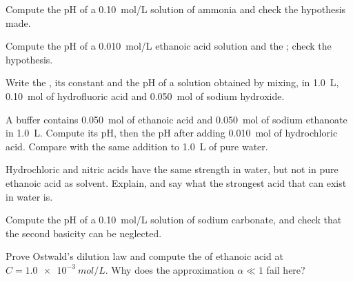 \begin{exercise}[$\star\star$]\label{exo:b1:predominant-reaction:5}
Compute the pH of a \qty{0.10}{mol/L} solution of ammonia and check the
hypothesis made.
\end{exercise}

\begin{exercise}[$\star\star$]\label{exo:b1:predominant-reaction:6}
Compute the pH of a \qty{0.010}{mol/L} ethanoic acid solution and the
; check the hypothesis.
\end{exercise}

\begin{exercise}[$\star\star$]\label{exo:b1:predominant-reaction:7}
Write the , its constant and the pH of a solution
obtained by mixing, in \qty{1.0}{L}, \qty{0.10}{mol} of hydrofluoric acid
and \qty{0.050}{mol} of sodium hydroxide.
\end{exercise}

\begin{exercise}[$\star\star$]\label{exo:b1:predominant-reaction:8}
A buffer contains \qty{0.050}{mol} of ethanoic acid and \qty{0.050}{mol}
of sodium ethanoate in \qty{1.0}{L}. Compute its pH, then the pH after
adding \qty{0.010}{mol} of hydrochloric acid. Compare with the same
addition to \qty{1.0}{L} of pure water.
\end{exercise}

\begin{exercise}[$\star\star$]\label{exo:b1:predominant-reaction:9}
Hydrochloric and nitric acids have the same strength in water, but not in
pure ethanoic acid as solvent. Explain, and say what the strongest acid
that can exist in water is.
\end{exercise}

\begin{exercise}[$\star\star\star$]\label{exo:b1:predominant-reaction:10}
Compute the pH of a \qty{0.10}{mol/L} solution of sodium carbonate, and
check that the second basicity can be neglected.
\end{exercise}

\begin{exercise}[$\star\star\star$]\label{exo:b1:predominant-reaction:11}
Prove Ostwald's dilution law and compute the  of
ethanoic acid at $C = \qty{1.0e-3}{mol/L}$. Why does the
approximation $\alpha \ll 1$ fail here?
\end{exercise}

